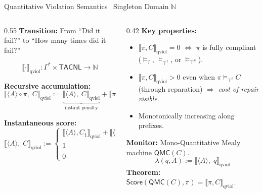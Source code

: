 \documentclass[9pt,aspectratio=169]{beamer}
\newcommand{\logic}[1]{\ensuremath{\mathsf{#1}}\xspace}
\newcommand{\cDL}{\logic{TACNL}}
\newcommand{\Prog}{\ensuremath{\mathsf{Prog}}\xspace}
\newcommand{\trace}[1]{\ensuremath{\langle #1 \rangle}\xspace}
\newcommand{\topt}{\top^t}
\newcommand{\bott}{\bot^t}
\newcommand{\topp}{\top^p}
\newcommand{\satt}{\models_{\topt}}
\newcommand{\violt}{\models_{\bott}}
\newcommand{\presat}{\models_{?}}
\newcommand{\postsat}{\models_{\topp}}
\newcommand{\qsem}[1]{\llbracket #1 \rrbracket_{\text{qviol}}}
\newcommand{\qscore}{\ensuremath{\mathsf{Score}}}
\newcommand{\qmc}{\ensuremath{\mathsf{QMC}}}
\newcommand{\LH}{\ensuremath{\mathsf{LH}}}
\begin{document}
\begin{frame}{Quantitative Violation Semantics \textemdash\ Singleton Domain $\mathbb{N}$}
\small
\begin{columns}[T]
\begin{column}{0.55\textwidth}
  \textbf{Transition:} From ``Did it fail?'' to ``How many times did it fail?''

  \[
  \qsem{\cdot} : \Gamma^* \times \cDL \to \mathbb{N}
  \]

  \textbf{Recursive accumulation:}
  \[
  \qsem{\trace{A} \circ \pi,\; C} :=
    \underbrace{\qsem{\trace{A},\;C}}_{\text{instant penalty}}
    +
    \underbrace{\qsem{\pi,\;\Prog(\trace{A},C)}}_{\text{suffix score}}
  \]

  \textbf{Instantaneous score:}
  \[
  \qsem{\trace{A},\;C} :=
  \begin{cases}
    \qsem{\trace{A},C_1} + \qsem{\trace{A},C_2} & C = C_1 \wedge C_2\\
    1 & \trace{A} \violt \LH(C)\\
    0 & \text{otherwise}
  \end{cases}
  \]
\end{column}
\begin{column}{0.42\textwidth}
  \textbf{Key properties:}
  \begin{itemize}
    \item $\qsem{\pi,C} = 0$ $\Leftrightarrow$ $\pi$ is fully compliant ($\presat$, $\satt$, or $\postsat$).
    \item $\qsem{\pi,C} > 0$ even when $\pi \satt C$ (through reparation) $\Rightarrow$ \emph{cost of repair visible}.
    \item Monotonically increasing along prefixes.
  \end{itemize}

  \vspace{3mm}
  \textbf{Monitor:} Mono-Quantitative Mealy machine $\qmc(C)$.
  \[
  \lambda(q,A) := \qsem{\trace{A},\;q}
  \]
  \textbf{Theorem:} $\qscore(\qmc(C),\pi) = \qsem{\pi,C}$.
\end{column}
\end{columns}
\end{frame}
\end{document}
